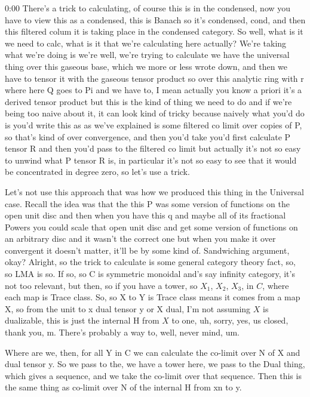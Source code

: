 \begin{unfinished}{0:00}
There's a trick to calculating, of course this is in the condensed, now you have to view this as a condensed, this is Banach so it's condensed, cond, and then this filtered colum it is taking place in the condensed category. So well, what is it we need to calc, what is it that we're calculating here actually? We're taking what we're doing is we're well, we're trying to calculate we have the universal thing over this gaseous base, which we more or less wrote down, and then we have to tensor it with the gaseous tensor product so over this analytic ring with r where here Q goes to Pi and we have to, I mean actually you know a priori it's a derived tensor product but this is the kind of thing we need to do and if we're being too naive about it, it can look kind of tricky because naively what you'd do is you'd write this as as we've explained is some filtered co limit over copies of P, so that's kind of over convergence, and then you'd take you'd first calculate P tensor R and then you'd pass to the filtered co limit but actually it's not so easy to unwind what P tensor R is, in particular it's not so easy to see that it would be concentrated in degree zero, so let's use a trick.

Let's not use this approach that was how we produced this thing in the Universal case. Recall the idea was that the this P was some version of functions on the open unit disc and then when you have this q and maybe all of its fractional Powers you could scale that open unit disc and get some version of functions on an arbitrary disc and it wasn't the correct one but when you make it over convergent it doesn't matter, it'll be by some kind of.
Sandwiching argument, okay? Alright, so the trick to calculate is some general category theory fact, so, so LMA is so. If so, so C is symmetric monoidal and's say infinity category, it's not too relevant, but then, so if you have a tower, so $X_1$, $X_2$, $X_3$, in $C$, where each map is Trace class. So, so X to Y is Trace class means it comes from a map X, so from the unit to x dual tensor y or X dual, I'm not assuming $X$ is dualizable, this is just the internal H from $X$ to one, uh, sorry, yes, us closed, thank you, m. There's probably a way to, well, never mind, um.

Where are we, then, for all Y in C we can calculate the co-limit over N of X and dual tensor y. So we pass to the, we have a tower here, we pass to the Dual thing, which gives a sequence, and we take the co-limit over that sequence. Then this is the same thing as co-limit over N of the internal H from xn to y.


\end{unfinished}
